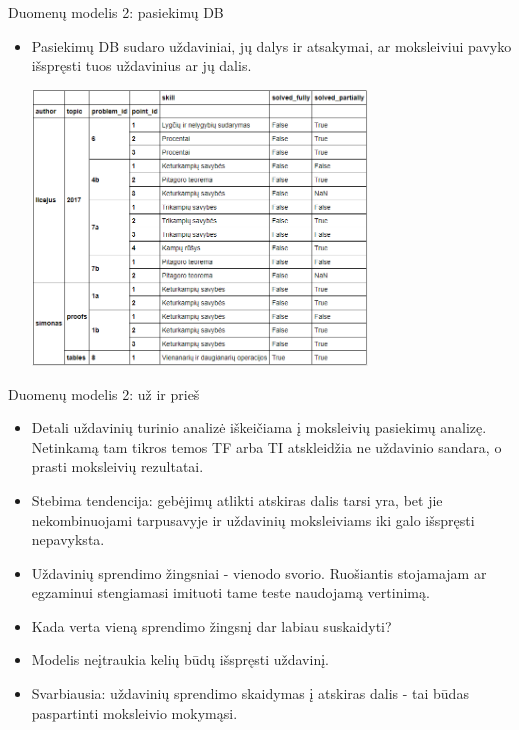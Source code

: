 \documentclass[xcolor={dvipsnames}]{beamer}
\begin{document}
\begin{frame}[fragile]{Duomenų modelis 2: pasiekimų DB}
\begin{itemize}
\item<1-> Pasiekimų DB sudaro uždaviniai, jų dalys ir atsakymai, ar moksleiviui pavyko išspręsti tuos uždavinius ar jų dalis.

\includegraphics[width=0.7\textwidth]{skills_db.png}
\end{itemize}
\end{frame}

\begin{frame}[fragile]{Duomenų modelis 2: už ir prieš}
\begin{itemize}
\item<1->  Detali uždavinių turinio analizė iškeičiama į moksleivių pasiekimų analizę. Netinkamą tam tikros temos TF arba TI atskleidžia ne uždavinio sandara, o prasti moksleivių rezultatai.
\item<2->  Stebima tendencija: gebėjimų atlikti atskiras dalis tarsi yra, bet jie nekombinuojami tarpusavyje ir uždavinių moksleiviams iki galo išspręsti nepavyksta.
\item<3->  Uždavinių sprendimo žingsniai - vienodo svorio. Ruošiantis stojamajam ar egzaminui stengiamasi imituoti tame teste naudojamą vertinimą.
\item<4->  Kada verta vieną sprendimo žingsnį dar labiau suskaidyti?
\item<5->  Modelis neįtraukia kelių būdų išspręsti uždavinį.
\item<6->  Svarbiausia:  uždavinių sprendimo skaidymas į atskiras dalis - tai būdas paspartinti moksleivio mokymąsi.
\end{itemize}
\end{frame}
\end{document}
